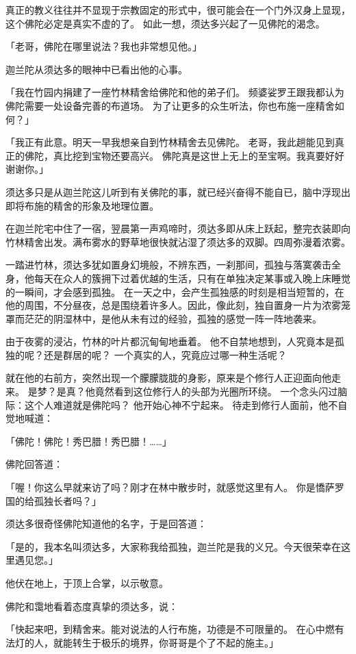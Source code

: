 \documentclass[twoside,openany]{book}
\begin{document}
真正的教义往往并不显现于宗教固定的形式中，很可能会在一个门外汉身上显现，这个佛陀必定是真实不虚的了。
如此一想，须达多兴起了一见佛陀的渴念。

「老哥，佛陀在哪里说法？我也非常想见他。」

迦兰陀从须达多的眼神中已看出他的心事。

「我在竹园内捐建了一座竹林精舍给佛陀和他的弟子们。
频婆娑罗王跟我都认为佛陀需要一处设备完善的布道场。
为了让更多的众生听法，你也布施一座精舍如何？」

「我正有此意。明天一早我想亲自到竹林精舍去见佛陀。
老哥，我此趟能见到真正的佛陀，真比挖到宝物还要高兴。
佛陀真是这世上无上的至宝啊。我真要好好谢谢你。」

须达多只是从迦兰陀这儿听到有关佛陀的事，就已经兴奋得不能自已，脑中浮现出即将布施的精舍的形象及地理位置。

在迦兰陀宅中住了一宿，翌晨第一声鸡啼时，须达多即从床上跃起，整完衣装即向竹林精舍出发。满布雾水的野草地很快就沾湿了须达多的双脚。四周弥漫着浓雾。

一踏进竹林，须达多犹如置身幻境般，不辨东西，一刹那间，孤独与落寞袭击全身，他每天在众人的簇拥下过着优越的生活，只有在单独决定某事或入晚上床睡觉的一瞬间，才会感到孤独。
在一天之中，会产生孤独感的时刻是相当短暂的，在他的周围，不分昼夜，总是围绕着许多人。因此，像此刻，独自置身一片为浓雾笼罩而茫茫的阴湿林中，是他从未有过的经验，孤独的感觉一阵一阵地袭来。

由于夜雾的浸沾，竹林的叶片都沉甸甸地垂着。
他不自禁地想到，人究竟本是孤独的呢？还是群居的呢？
一个真实的人，究竟应过哪一种生活呢？

就在他的右前方，突然出现一个朦朦胧胧的身影，原来是个修行人正迎面向他走来。
是梦？是真？他竟然看到这位修行人的头部为光圈所环绕。
一个念头闪过脑际：这个人难道就是佛陀吗？
他开始心神不宁起来。
待走到修行人面前，他不自觉地喊道：

「佛陀！佛陀！秀巴腊！秀巴腊！……」

佛陀回答道：

「喔！你这么早就来访了吗？刚才在林中散步时，就感觉这里有人。
你是憍萨罗国的给孤独长者吗？」

须达多很奇怪佛陀知道他的名字，于是回答道：

「是的，我本名叫须达多，大家称我给孤独，迦兰陀是我的义兄。今天很荣幸在这里遇见您。」

他伏在地上，于顶上合掌，以示敬意。

佛陀和霭地看着态度真挚的须达多，说：

「快起来吧，到精舍来。能对说法的人行布施，功德是不可限量的。
在心中燃有法灯的人，就能转生于极乐的境界，你哥哥是个了不起的施主。」
\end{document}
